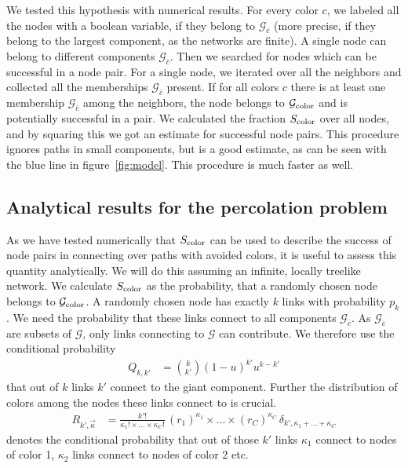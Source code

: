\documentclass[aps, pre, onecolumn, a4paper, floatfix]{revtex4}
\begin{document}
We tested this hypothesis with numerical results. For every color $c$, we labeled all the 
nodes with a boolean variable, if they belong to ${\mathcal G}_{\bar c}$ (more precise, if they 
belong to the largest component, as the networks are finite). A single node can 
belong to different components ${\mathcal G}_{\bar c}$. Then we searched for 
nodes which can be successful in a node pair. For a single node, we iterated over 
all the neighbors and collected all the memberships ${\mathcal G}_{\bar c}$ present. If for 
all colors $c$ there is at least one membership ${\mathcal G}_{\bar c}$ among the neighbors, 
the node belongs to ${\mathcal G}_{\rm color}$ and is
potentially successful in a pair. We calculated the 
fraction $S_{\rm color}$ over all nodes, and by squaring this we got an estimate for 
successful node pairs. This procedure ignores paths in small components, but 
is a good estimate, as can be seen with the blue line in figure~\ref{fig:model}. 
This procedure is much faster as well.


\subsection{Analytical results for the percolation problem}

As we have tested numerically that $S_{\rm color}$ can be used to describe the success of node 
pairs in connecting over paths with avoided colors, it is useful to assess this quantity 
analytically. We will do this assuming an infinite, locally treelike network. 
We calculate $S_{\rm color}$ as the probability, that a randomly chosen node belongs to 
${\mathcal G}_{\rm color}$. A randomly chosen node has exactly $k$ links with probability $p_k$. We 
need the probability that these links connect to all components ${\mathcal G}_{\bar c}$. As 
${\mathcal G}_{\bar c}$ are subsets of ${\mathcal G}$, only links connecting to ${\mathcal G}$ 
can contribute. We therefore use the conditional probability
%
\begin{align}
Q_{k,k'} &={k \choose k'}(1-u)^{k'}u^{k-k'}
\end{align}
%
that out of $k$ links $k'$ connect to the giant component. Further the distribution of colors 
among the nodes these links connect to is crucial. 
%
\begin{align}
R_{k',\vec \kappa} &=\frac{k'!}{\kappa_1! \times \dots \times \kappa_C!} \,
(r_1)^{\kappa_1} \times \dots \times (r_C)^{\kappa_C}\,
\delta_{k',\kappa_1+\dots + \kappa_C}\label{eq:R_kk}
\end{align}
%
denotes the conditional probability that out of those $k'$ links $\kappa_1$ connect to nodes of 
color 1, $\kappa_2$ links connect to nodes of color 2 etc. 
\end{document}
